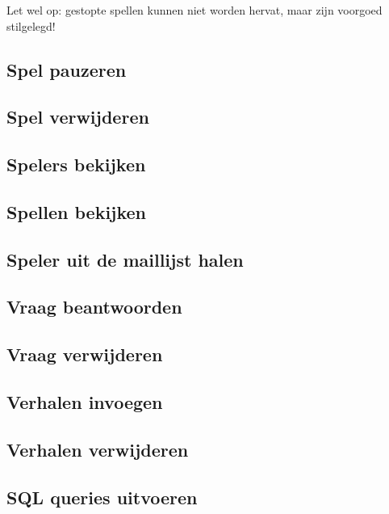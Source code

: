 \documentclass[12pt]{article}
\begin{document}
    Let wel op: gestopte spellen kunnen niet worden hervat, maar zijn voorgoed stilgelegd!
  
  \subsection{Spel pauzeren}
  
  \subsection{Spel verwijderen}
  
  \subsection{Spelers bekijken}
  
  \subsection{Spellen bekijken}
  
  \subsection{Speler uit de maillijst halen}
  
  \subsection{Vraag beantwoorden}
  
  \subsection{Vraag verwijderen}
  
  \subsection{Verhalen invoegen}
  
  \subsection{Verhalen verwijderen}
  
  \subsection{SQL queries uitvoeren}
\end{document}
